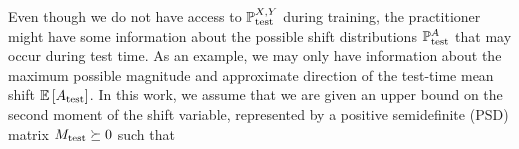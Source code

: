 Even though we do not have access to $\mathbb{P}_{\mathrm{test}}^{X,Y}$ during training,
the practitioner might have some information about the possible
shift distributions $\mathbb{P}^A_{\mathrm{test}}$ that may occur during test time. 
As an example, we may 
only have information about the maximum possible magnitude and approximate direction of the test-time mean shift $\mathbb{E}\,[A_{\text{test}}]$. 
In this work, we assume that we are given 
an upper bound on the second moment of the shift variable, represented by a positive semidefinite (PSD) matrix $M_{\mathrm{test}}\succeq 0$ such that 
